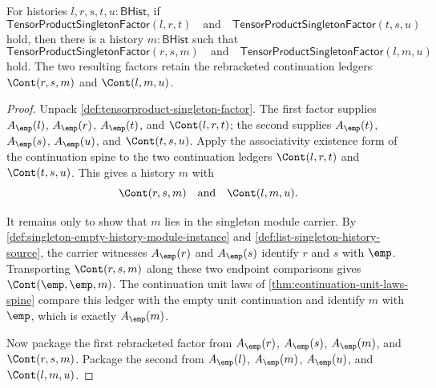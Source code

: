\begin{theorem}
\label{thm:tensorproduct-singleton-factor-associator}
For histories $l,r,s,t,u:\mathsf{BHist}$, if
$$
\mathsf{TensorProductSingletonFactor}(l,r,t)
\quad\text{and}\quad
\mathsf{TensorProductSingletonFactor}(t,s,u)
$$
hold, then there is a history $m:\mathsf{BHist}$ such that
$$
\mathsf{TensorProductSingletonFactor}(r,s,m)
\quad\text{and}\quad
\mathsf{TensorProductSingletonFactor}(l,m,u)
$$
hold. The two resulting factors retain the rebracketed continuation ledgers
$\Cont(r,s,m)$ and $\Cont(l,m,u)$.
\end{theorem}
\begin{proof}
Unpack \autoref{def:tensorproduct-singleton-factor}. The first factor supplies
$A_{\emp}(l)$, $A_{\emp}(r)$, $A_{\emp}(t)$, and $\Cont(l,r,t)$; the second
supplies $A_{\emp}(t)$, $A_{\emp}(s)$, $A_{\emp}(u)$, and $\Cont(t,s,u)$.
Apply the associativity existence form of the continuation spine to the two
continuation ledgers $\Cont(l,r,t)$ and $\Cont(t,s,u)$. This gives a history
$m$ with
$$
\Cont(r,s,m)
\quad\text{and}\quad
\Cont(l,m,u).
$$

It remains only to show that $m$ lies in the singleton module carrier. By
\autoref{def:singleton-empty-history-module-instance} and
\autoref{def:list-singleton-history-source}, the carrier witnesses
$A_{\emp}(r)$ and $A_{\emp}(s)$ identify $r$ and $s$ with $\emp$. Transporting
$\Cont(r,s,m)$ along these two endpoint comparisons gives
$\Cont(\emp,\emp,m)$. The continuation unit laws of
\autoref{thm:continuation-unit-laws-spine} compare this ledger with the empty
unit continuation and identify $m$ with $\emp$, which is exactly
$A_{\emp}(m)$.

Now package the first rebracketed factor from $A_{\emp}(r)$, $A_{\emp}(s)$,
$A_{\emp}(m)$, and $\Cont(r,s,m)$. Package the second from $A_{\emp}(l)$,
$A_{\emp}(m)$, $A_{\emp}(u)$, and $\Cont(l,m,u)$.
\end{proof}

